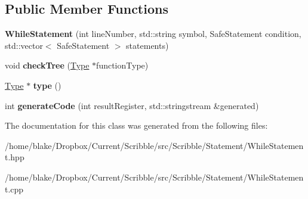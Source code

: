 \subsection*{Public Member Functions}
\begin{DoxyCompactItemize}
\item 
\hypertarget{class_scribble_core_1_1_while_statement_a391f48c446bd92f94323ab1e4fd6597b}{{\bfseries While\-Statement} (int line\-Number, std\-::string symbol, Safe\-Statement condition, std\-::vector$<$ Safe\-Statement $>$ statements)}\label{class_scribble_core_1_1_while_statement_a391f48c446bd92f94323ab1e4fd6597b}

\item 
\hypertarget{class_scribble_core_1_1_while_statement_aa2533fad6a03fe23f87e6247816c8da1}{void {\bfseries check\-Tree} (\hyperlink{class_scribble_core_1_1_type}{Type} $\ast$function\-Type)}\label{class_scribble_core_1_1_while_statement_aa2533fad6a03fe23f87e6247816c8da1}

\item 
\hypertarget{class_scribble_core_1_1_while_statement_a969760fa6514a6691c7759f95eaa69e0}{\hyperlink{class_scribble_core_1_1_type}{Type} $\ast$ {\bfseries type} ()}\label{class_scribble_core_1_1_while_statement_a969760fa6514a6691c7759f95eaa69e0}

\item 
\hypertarget{class_scribble_core_1_1_while_statement_ac9ce44b3804d77ca0e2f12cfedbaf9f5}{int {\bfseries generate\-Code} (int result\-Register, std\-::stringstream \&generated)}\label{class_scribble_core_1_1_while_statement_ac9ce44b3804d77ca0e2f12cfedbaf9f5}

\end{DoxyCompactItemize}


The documentation for this class was generated from the following files\-:\begin{DoxyCompactItemize}
\item 
/home/blake/\-Dropbox/\-Current/\-Scribble/src/\-Scribble/\-Statement/While\-Statement.\-hpp\item 
/home/blake/\-Dropbox/\-Current/\-Scribble/src/\-Scribble/\-Statement/While\-Statement.\-cpp\end{DoxyCompactItemize}
